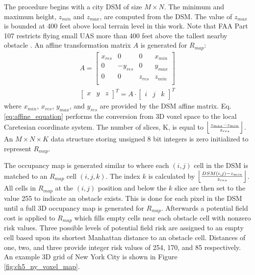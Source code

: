 The procedure begins with a city DSM of size $M\times N$. The minimum and maximum height, $z_{min}$ and $z_{max}$, are computed from the DSM. The value of $z_{max}$ is bounded at 400 feet above local terrain level in this work. Note that FAA Part 107 restricts flying small UAS more than 400 feet above the tallest nearby obstacle \cite{federal_aviation_administration_code_2016}. An affine transformation matrix $A$ is generated for $R_{map}$:
\begin{align}
        A = \begin{bmatrix} \label{eq:affine_matrix}
        x_{res} & 0 & 0 & x_{min} \\
        0 &  -y_{res} & 0 & {y_{max}} \\
        0 &  0 & z_{res} & {z_{min}} \\
        \end{bmatrix}  \\
        \begin{bmatrix}x & y & z  \end{bmatrix}^T = A \cdot \begin{bmatrix}i & j & k  \end{bmatrix}^T \label{eq:affine_equation}
\end{align}
where $x_{min}$, $x_{res}$, $y_{max}$, and $y_{res}$ are provided by the DSM affine matrix. Eq. \ref{eq:affine_equation} performs the conversion from 3D voxel space to the local Caretesian coordinate system.  
The number of slices, K, is equal to $\floor*{\frac{z_{max} - z_{min}}{z_{res}}}$. An $M \times N \times K$ data structure storing unsigned 8 bit integers is zero initialized to represent $R_{map}$.

The occupancy map is generated similar to \cite{ten_harmsel_emergency_2017} where each $(i,j)$ cell in the DSM is matched to an $R_{map}$ cell $(i, j, k)$. The index $k$ is calculated by $\floor*{\frac{DSM(i,j) - z_{min}}{z_{res}}}$. All cells in $R_{map}$ at the $(i,j)$ position and below the $k$ slice are then set to the value 255 to indicate an obstacle exists. This is done for each pixel in the DSM until a full 3D occupancy map is generated for $R_{map}$.  Afterwards a potential field cost is applied to $R_{map}$ which fills empty cells near each obstacle cell with nonzero risk values.  Three possible levels of potential field risk are assigned to an empty cell based upon its shortest Manhattan distance to an obstacle cell. Distances of one, two, and three provide integer risk values of 254, 170, and 85 respectively. An example 3D grid of New York City is shown in Figure \ref{fig:ch5_ny_voxel_map}.

